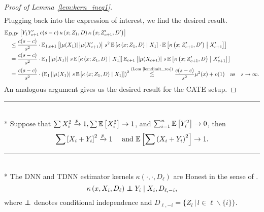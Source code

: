 \begin{proof}[Proof of Lemma~\ref{lem:kern_ineq1}]
\begin{equation}
\begin{aligned}
		\end{aligned}
	\end{equation}
	Plugging back into the expression of interest, we find the desired result.
	\begin{equation}
		\begin{aligned}
			& \mathbb{E}_{D, D^{\prime}}\left[Y_{1}Y_{c+1}^{\prime} \, c(s-c) \, \kappa\left(x; Z_{1}, D\right)\kappa\left(x; Z_{c+1}^{\prime}, D^{\prime}\right)\right]\\
			& \quad \leq \frac{c(s-c)}{s^2} \cdot \mathbb{E}_{1, c+1}\left[\left|\mu(X_1)\right| \left|\mu(X_{c+1}^{\prime})\right| \, s^2 \, 
			\mathbb{E}\left[\kappa\left(x; Z_{1}, D\right) \; \middle| \; X_1\right] 
			\cdot \mathbb{E}\left[\kappa\left(x; Z_{c+1}^{\prime}, D^{\prime}\right) \; \middle| \; X_{c+1}^{\prime}\right]\right]\\
			& \quad = \frac{c(s-c)}{s^2} \cdot \mathbb{E}_{1}\left[\left|\mu(X_1)\right| \, s \, \mathbb{E}\left[\kappa\left(x; Z_{1}, D\right) \; \middle| \; X_1\right]\right]
			\mathbb{E}_{c+1}\left[\left|\mu(X_{c+1})\right| \, s \, \mathbb{E}\left[\kappa\left(x; Z_{c+1}^{\prime}, D\right) \; \middle| \; X_{c+1}^{\prime}\right]\right]\\
			& \quad = \frac{c(s-c)}{s^2} \cdot \left(\mathbb{E}_{1}\left[\left|\mu(X_1)\right| \, s \, \mathbb{E}\left[\kappa\left(x; Z_{1}, D\right) \; \middle| \; X_1\right]\right]\right)^2
			\overset{\text{(Lem~\ref{lem:limit_res})}}{\lesssim}  \frac{c(s-c)}{s^2}\mu^2(x) + o(1)
			\quad \text{as} \quad s \rightarrow \infty.
		\end{aligned}
	\end{equation}
	An analogous argument gives us the desired result for the CATE setup.
\end{proof}

\hrule

\begin{lem}\label{lem:peng1}\mbox{}\\*
	Suppose that $\sum X_{i}^2 \xrightarrow{p} 1, \sum \mathbb{E}\left[X_{i}^2\right] \rightarrow 1$, and $\sum_{i=1}^n \mathbb{E}\left[Y_{i}^2\right] \rightarrow 0$, then
	\begin{equation}
		\sum\left[X_{i}+Y_{i}\right]^2 \xrightarrow{p} 1 \quad \text { and } \mathbb{E}\left[\sum\left(X_{i}+Y_{i}\right)^2\right] \rightarrow 1.
	\end{equation}
\end{lem}

\hrule

\begin{lem}\label{lem:honesty}\mbox{}\\*
	The DNN and TDNN estimator kernels $\kappa\left(\cdot, \cdot, D_{\ell}\right)$ are Honest in the sense of \citet{wager_estimation_2018}.
	\begin{equation*}
		\kappa\left(x, X_{i}, D_{\ell}\right) \perp\!\!\!\!\perp Y_{i} \mid X_{i}, D_{\ell,-i},
	\end{equation*}
	where $\perp\!\!\!\!\perp$ denotes conditional independence and $D_{\ell,-i} = \{Z_l \, | \, l \in \ell \backslash \{i\}\}$.
\end{lem}